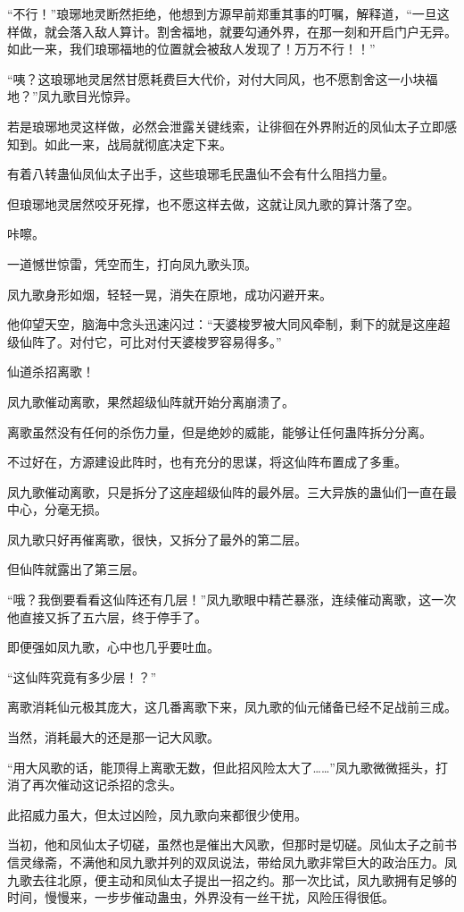 \begin{this_body}
“不行！”琅琊地灵断然拒绝，他想到方源早前郑重其事的叮嘱，解释道，“一旦这样做，就会落入敌人算计。割舍福地，就要勾通外界，在那一刻和开启门户无异。如此一来，我们琅琊福地的位置就会被敌人发现了！万万不行！！”

“咦？这琅琊地灵居然甘愿耗费巨大代价，对付大同风，也不愿割舍这一小块福地？”凤九歌目光惊异。

若是琅琊地灵这样做，必然会泄露关键线索，让徘徊在外界附近的凤仙太子立即感知到。如此一来，战局就彻底决定下来。

有着八转蛊仙凤仙太子出手，这些琅琊毛民蛊仙不会有什么阻挡力量。

但琅琊地灵居然咬牙死撑，也不愿这样去做，这就让凤九歌的算计落了空。

咔嚓。

一道憾世惊雷，凭空而生，打向凤九歌头顶。

凤九歌身形如烟，轻轻一晃，消失在原地，成功闪避开来。

他仰望天空，脑海中念头迅速闪过：“天婆梭罗被大同风牵制，剩下的就是这座超级仙阵了。对付它，可比对付天婆梭罗容易得多。”

仙道杀招离歌！

凤九歌催动离歌，果然超级仙阵就开始分离崩溃了。

离歌虽然没有任何的杀伤力量，但是绝妙的威能，能够让任何蛊阵拆分分离。

不过好在，方源建设此阵时，也有充分的思谋，将这仙阵布置成了多重。

凤九歌催动离歌，只是拆分了这座超级仙阵的最外层。三大异族的蛊仙们一直在最中心，分毫无损。

凤九歌只好再催离歌，很快，又拆分了最外的第二层。

但仙阵就露出了第三层。

“哦？我倒要看看这仙阵还有几层！”凤九歌眼中精芒暴涨，连续催动离歌，这一次他直接又拆了五六层，终于停手了。

即便强如凤九歌，心中也几乎要吐血。

“这仙阵究竟有多少层！？”

离歌消耗仙元极其庞大，这几番离歌下来，凤九歌的仙元储备已经不足战前三成。

当然，消耗最大的还是那一记大风歌。

“用大风歌的话，能顶得上离歌无数，但此招风险太大了……”凤九歌微微摇头，打消了再次催动这记杀招的念头。

此招威力虽大，但太过凶险，凤九歌向来都很少使用。

当初，他和凤仙太子切磋，虽然也是催出大风歌，但那时是切磋。凤仙太子之前书信灵缘斋，不满他和凤九歌并列的双凤说法，带给凤九歌非常巨大的政治压力。凤九歌去往北原，便主动和凤仙太子提出一招之约。那一次比试，凤九歌拥有足够的时间，慢慢来，一步步催动蛊虫，外界没有一丝干扰，风险压得很低。


\end{this_body}
